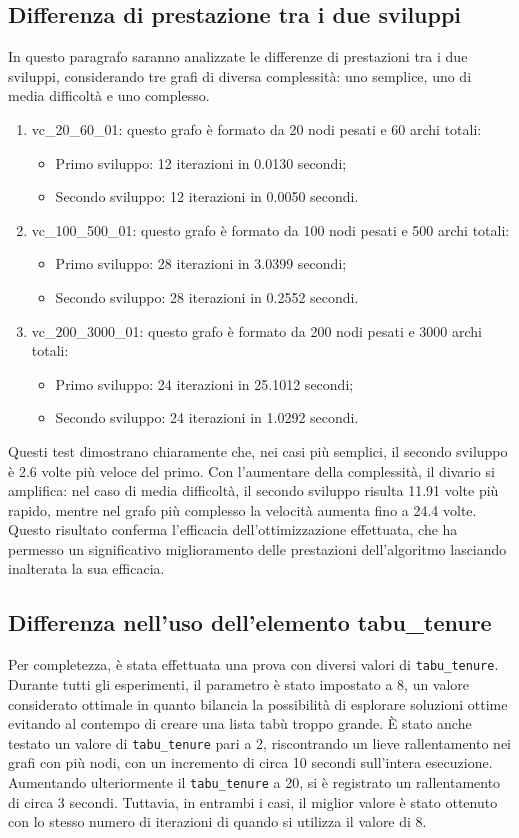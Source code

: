 \documentclass[12pt,a4paper,twoside]{article}
\begin{document}
\subsection{Differenza di prestazione tra i due sviluppi}
In questo paragrafo saranno analizzate le differenze di prestazioni tra i due sviluppi, considerando tre grafi di diversa complessità: uno semplice, uno di media difficoltà e uno complesso.
\begin{enumerate}
    \item vc\_20\_60\_01: questo grafo è formato da 20 nodi pesati e 60 archi totali:
    \begin{itemize}
        \item Primo sviluppo: 12 iterazioni in 0.0130 secondi;
        \item Secondo sviluppo: 12 iterazioni in 0.0050 secondi.
    \end{itemize}
    \item vc\_100\_500\_01: questo grafo è formato da 100 nodi pesati e 500 archi totali:
    \begin{itemize}
        \item Primo sviluppo: 28 iterazioni in 3.0399 secondi;
        \item Secondo sviluppo: 28 iterazioni in 0.2552 secondi.
    \end{itemize}
    \item vc\_200\_3000\_01: questo grafo è formato da 200 nodi pesati e 3000 archi totali:
    \begin{itemize}
        \item Primo sviluppo: 24 iterazioni in 25.1012 secondi;
        \item Secondo sviluppo: 24 iterazioni in 1.0292 secondi.
    \end{itemize}
\end{enumerate}
Questi test dimostrano chiaramente che, nei casi più semplici, il secondo sviluppo è 2.6 volte più veloce del primo. Con l'aumentare della complessità, il divario si amplifica: nel caso di media difficoltà, il secondo sviluppo risulta 11.91 volte più rapido, mentre nel grafo più complesso la velocità aumenta fino a 24.4 volte. Questo risultato conferma l'efficacia dell'ottimizzazione effettuata, che ha permesso un significativo miglioramento delle prestazioni dell'algoritmo lasciando inalterata la sua efficacia.
\subsection{Differenza nell'uso dell'elemento tabu\_tenure}
Per completezza, è stata effettuata una prova con diversi valori di \texttt{tabu\_tenure}. Durante tutti gli esperimenti, il parametro è stato impostato a 8, un valore considerato ottimale in quanto bilancia la possibilità di esplorare soluzioni ottime evitando al contempo di creare una lista tabù troppo grande. È stato anche testato un valore di \texttt{tabu\_tenure} pari a 2, riscontrando un lieve rallentamento nei grafi con più nodi, con un incremento di circa 10 secondi sull'intera esecuzione. Aumentando ulteriormente il \texttt{tabu\_tenure} a 20, si è registrato un rallentamento di circa 3 secondi. Tuttavia, in entrambi i casi, il miglior valore è stato ottenuto con lo stesso numero di iterazioni di quando si utilizza il valore di 8.
\end{document}
